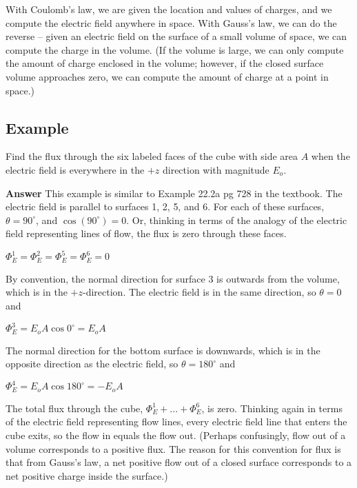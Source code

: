 \documentclass{article}
\begin{document}
With Coulomb's law, we are given the location and values of charges, and we compute the electric field anywhere in space. With Gauss's law, we can do the reverse -- given an electric field on the surface of a small volume of space, we can compute the charge in the volume. (If the volume is large, we can only compute the amount of charge enclosed in the volume; however, if the closed surface volume approaches zero, we can compute the amount of charge at a point in space.)

\subsection{Example}



Find the flux through the six labeled faces of the cube with side area $A$ when the electric field is everywhere in the $+z$ direction with magnitude $E_o$.

{\bf Answer} This example is similar to Example 22.2a pg 728 in the textbook. The electric field is parallel to surfaces 1, 2, 5, and 6. For each of these surfaces, $\theta=90^\circ$, and $\cos( 90^\circ)=0$. Or, thinking in terms of the analogy of the electric field representing lines of flow, the flux is zero through these faces. 



$\Phi_E^{1}=\Phi_E^{2}=\Phi_E^{5}=\Phi_E^{6}=0$

By convention, the normal direction for surface 3 is outwards from the volume, which is in the $+z$-direction. The electric field is in the same direction, so $\theta=0$ and

$\Phi_E^{3}=E_oA\cos0^\circ=E_oA$

The normal direction for the bottom surface is downwards, which is in the opposite direction as the electric field, so $\theta=180^\circ$ and

$\Phi_E^{4}=E_oA\cos 180^\circ=-E_oA$

The total flux through the cube, $\Phi_E^1+...+\Phi_E^6$, is zero. Thinking again in terms of the electric field representing flow lines, every electric field line that enters the cube exits, so the flow in equals the flow out. (Perhaps confusingly, flow out of a volume corresponds to a positive flux. The reason for this convention for flux is that from Gauss's law, a net positive flow out of a closed surface corresponds to a net positive charge inside the surface.)
\end{document}
